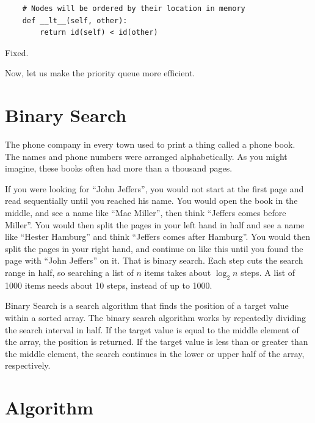 \begin{verbatim}
    # Nodes will be ordered by their location in memory
    def __lt__(self, other):
        return id(self) < id(other)
\end{verbatim}

Fixed.

Now, let us make the priority queue more efficient.

\section{Binary Search}

The phone company in every town used to print a thing called a phone
book. The names and phone numbers were arranged alphabetically.  As
you might imagine, these books often had more than a thousand pages.

If you were looking for ``John Jeffers'', you would not start at the
first page and read sequentially until you reached his name.  You
would open the book in the middle, and see a name like ``Mac Miller'',
then think ``Jeffers comes before Miller''. You would then split
the pages in your left hand in half and see a name like ``Hester
Hamburg'' and think ``Jeffers comes after Hamburg''. You would then
split the pages in your right hand, and continue on like this until you found the page
with ``John Jeffers'' on it.
That is binary search. Each step cuts the search range in half, so searching a list of $n$ items takes about $\log_2 n$ steps. A list of 1000 items needs about 10 steps, instead of up to 1000.

Binary Search is a search algorithm that finds the position of a target value within a sorted array. The binary search algorithm works by repeatedly dividing the search interval in half. If the target value is equal to the middle element of the array, the position is returned. If the target value is less than or greater than the middle element, the search continues in the lower or upper half of the array, respectively.

\section{Algorithm}

